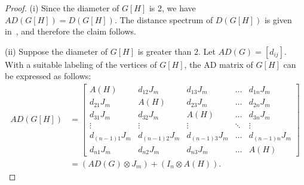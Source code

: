 \documentclass[12pt]{article}
\numberwithin{equation}{section}
\begin{document}
	\begin{proof}
		(i) Since the diameter of $G[H]$ is 2, we have $AD(G[H]) = D(G[H])$. 
		The distance spectrum of $D(G[H])$ is given in~\cite[Theorem~3.3]{indulal2009distance}, and therefore the claim follows.
		
		(ii) Suppose the diameter of $G[H]$ is greater than $2$. Let $AD(G) = [d_{ij}]$. 
		With a suitable labeling of the vertices of $G[H]$, the AD matrix of $G[H]$ can be expressed as follows:
		\[\begin{aligned}
				AD(G[H])&=\begin{bmatrix}
				A(H) & d_{12}J_m & d_{13}J_m & \dots &  d_{1n}J_m\\
				d_{21}J_m & A(H) & d_{23}J_m & \dots &  d_{2n}J_m\\
				d_{31}J_m & d_{32}J_m & A(H) & \dots &  d_{3n}J_m\\
				\vdots & \vdots & \vdots & \ddots  & \vdots \\
				d_{(n-1)1}J_m & d_{(n-1)2}J_m & d_{(n-1)3}J_m & \dots & d_{(n-1)n}J_m\\
				d_{n1}J_m & d_{n2}J_m & d_{n3}J_m & \dots & A(H)
			\end{bmatrix}\\
			&=(AD(G) \otimes J_m) + (I_n \otimes A(H)).
		\end{aligned}
		\]
				

\end{proof}
\end{document}
